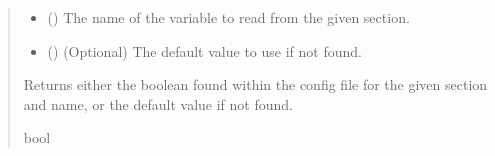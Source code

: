\documentclass[letterpaper,10pt,english]{sphinxmanual}
\begin{document}
\begin{fulllineitems}
\begin{fulllineitems}
\begin{quote}
\begin{description}
\begin{itemize}
\item {} 
\sphinxAtStartPar
{} () \textendash{} The name of the variable to read from the given section.

\item {} 
\sphinxAtStartPar
{} () \textendash{} (Optional) The default value to use if not found.

\end{itemize}

\sphinxAtStartPar
Returns either the boolean found within the config file for
the given section and name, or the default value if not found.

\sphinxAtStartPar
bool

\end{description}\end{quote}

\end{fulllineitems}



\end{fulllineitems}
\end{document}
